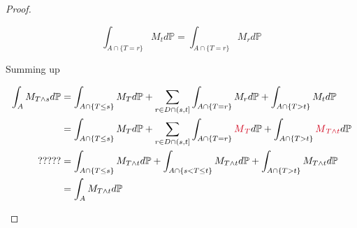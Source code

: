 \documentclass[10pt,a4paper]{article}
\theoremstyle{definition}
\begin{document}
\begin{proof}
\begin{enumerate}
		      \begin{equation*}
		      	\int _{A\cap \{T=r\}} M_{t} d\mathbb{P} =\int _{A\cap \{T=r\}} M_{r} d\mathbb{P}
		      \end{equation*}
		      
		      Summing up
		      
		      \begin{align*}
		      	\int _{A} M_{T\land s} d\mathbb{P} & =\int _{A\cap \{T\leq s\}} M_{T} d\mathbb{P} +\sum _{r\in D\cap ( s,t]}\int _{A\cap \{T=r\}} M_{r} d\mathbb{P} +\int _{A\cap \{T >t\}} M_{t} d\mathbb{P}                                                                                                                                          \\
		      	                                   & =\int _{A\cap \{T\leq s\}} M_{T} d\mathbb{P} +\sum _{r\in D\cap ( s,t]}\int _{A\cap \{T=r\}}\textcolor[rgb]{0.82,0.01,0.11}{M}\textcolor[rgb]{0.82,0.01,0.11}{_{T}} d\mathbb{P} +\int _{A\cap \{T >t\}}\textcolor[rgb]{0.82,0.01,0.11}{M}\textcolor[rgb]{0.82,0.01,0.11}{_{T\land t}} d\mathbb{P} \\
		      	?????                              & =\int _{A\cap \{T\leq s\}} M_{T\land t} d\mathbb{P} +\int _{A\cap \{s< T\leq t\}} M_{T\land t} d\mathbb{P} +\int _{A\cap \{T >t\}} M_{T\land t} d\mathbb{P}                                                                                                                                       \\
		      	                                   & =\int _{A} M_{T\land t} d\mathbb{P}                                                                                                                                                                                                                                                               
		      \end{align*}
	\end{enumerate}
\end{proof}
\end{document}
